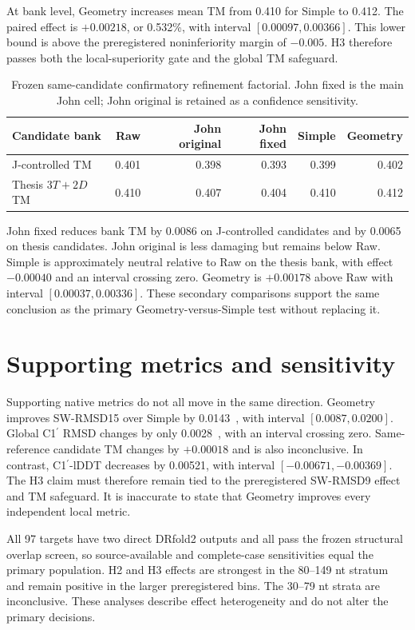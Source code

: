 \documentclass[12pt,a4paper,oneside]{report}
\newcommand{\cprime}{C1$^{\prime}$}
\newcommand{\angstrom}{\text{\AA}}
\begin{document}
At bank level, Geometry increases mean TM from 0.410 for Simple to 0.412. The paired
effect is $+0.00218$, or 0.532\%, with interval $[0.00097,0.00366]$. This lower bound
is above the preregistered noninferiority margin of $-0.005$. H3 therefore passes both
the local-superiority gate and the global TM safeguard.

\begin{table}[H]
\centering
\caption{Frozen same-candidate confirmatory refinement factorial. John fixed is the
main John cell; John original is retained as a confidence sensitivity.}
\begin{tabularx}{\textwidth}{Xrrrrr}
\toprule
Candidate bank & Raw & John original & John fixed & Simple & Geometry \\
\midrule
J-controlled TM & 0.401 & 0.398 & 0.393 & 0.399 & 0.402 \\
Thesis $3T+2D$ TM & 0.410 & 0.407 & 0.404 & 0.410 & 0.412 \\
\bottomrule
\end{tabularx}
\end{table}

John fixed reduces bank TM by 0.0086 on J-controlled candidates and by 0.0065 on
thesis candidates. John original is less damaging but remains below Raw. Simple is
approximately neutral relative to Raw on the thesis bank, with effect $-0.00040$ and
an interval crossing zero. Geometry is $+0.00178$ above Raw with interval
$[0.00037,0.00336]$. These secondary comparisons support the same conclusion as the
primary Geometry-versus-Simple test without replacing it.

\section{Supporting metrics and sensitivity}

Supporting native metrics do not all move in the same direction. Geometry improves
SW-RMSD15 over Simple by 0.0143~\angstrom{}, with interval
$[0.0087,0.0200]$. Global \cprime{} RMSD changes by only 0.0028~\angstrom{}, with an
interval crossing zero. Same-reference candidate TM changes by $+0.00018$ and is also
inconclusive. In contrast, \cprime{}-lDDT decreases by 0.00521, with interval
$[-0.00671,-0.00369]$. The H3 claim must therefore remain tied to the preregistered
SW-RMSD9 effect and TM safeguard. It is inaccurate to state that Geometry improves
every independent local metric.

All 97 targets have two direct DRfold2 outputs and all pass the frozen structural
overlap screen, so source-available and complete-case sensitivities equal the primary
population. H2 and H3 effects are strongest in the 80–149 nt stratum and remain
positive in the larger preregistered bins. The 30–79 nt strata are inconclusive.
These analyses describe effect heterogeneity and do not alter the primary decisions.
\end{document}
